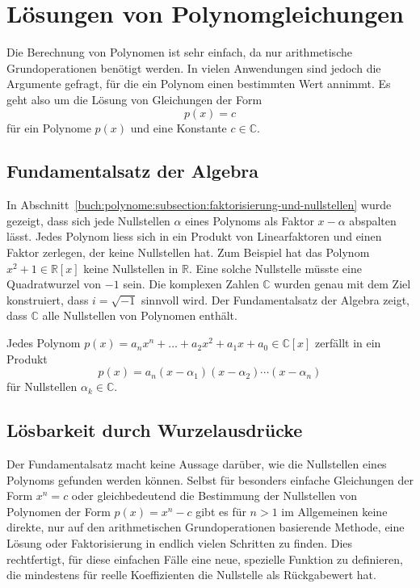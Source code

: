 %
%
%
\section{Lösungen von Polynomgleichungen
\label{buch:potenzen:section:loesungen}}
Die Berechnung von Polynomen ist sehr einfach, da nur arithmetische 
Grundoperationen benötigt werden.
In vielen Anwendungen sind jedoch die Argumente gefragt, für die ein
Polynom einen bestimmten Wert annimmt.
Es geht also um die Lösung von Gleichungen der Form
\[
p(x) = c
\]
für ein Polynome $p(x)$ und eine Konstante $c\in\mathbb{C}$.

%
%
\subsection{Fundamentalsatz der Algebra}
In Abschnitt~\ref{buch:polynome:subsection:faktorisierung-und-nullstellen}
wurde gezeigt, dass sich jede Nullstellen $\alpha$ eines Polynoms als
Faktor $x-\alpha$ abspalten lässt.
Jedes Polynom liess sich in ein Produkt von Linearfaktoren und
einen Faktor zerlegen, der keine Nullstellen hat.
Zum Beispiel hat das Polynom $x^2+1\in\mathbb{R}[x]$ keine
Nullstellen in $\mathbb{R}$.
Eine solche Nullstelle müsste eine Quadratwurzel von $-1$ sein.
Die komplexen Zahlen $\mathbb{C}$ wurden genau mit dem Ziel konstruiert,
dass $i=\sqrt{-1}$ sinnvoll wird.
Der Fundamentalsatz der Algebra zeigt, dass $\mathbb{C}$ alle
Nullstellen von Polynomen enthält.

\begin{satz}[Gauss]
%
%
\label{buch:potenzen:satz:fundamentalsatz}
Jedes Polynom $p(x)=a_nx^n+\dots + a_2x^2 + a_1x + a_0\in\mathbb{C}[x]$
zerfällt in ein Produkt
\[
p(x)
=
a_n
(x-\alpha_1)(x-\alpha_2)\cdots(x-\alpha_n)
\]
für Nullstellen $\alpha_k\in\mathbb{C}$.
\end{satz}


%
%
\subsection{Lösbarkeit durch Wurzelausdrücke}
Der Fundamentalsatz macht keine Aussage darüber, wie die Nullstellen
eines Polynoms gefunden werden können.
Selbst für besonders einfache Gleichungen der Form
\(
x^n = c
\)
oder gleichbedeutend die Bestimmung der Nullstellen von Polynomen der Form
\(
p(x) = x^n -c
\)
gibt es für $n>1$ im Allgemeinen keine direkte, nur auf den arithmetischen
Grundoperationen basierende Methode, eine Lösung oder Faktorisierung
in endlich vielen Schritten zu finden.
Dies rechtfertigt, für diese einfachen Fälle eine neue, spezielle
Funktion zu definieren, die mindestens für reelle Koeffizienten 
die Nullstelle als Rückgabewert hat.

